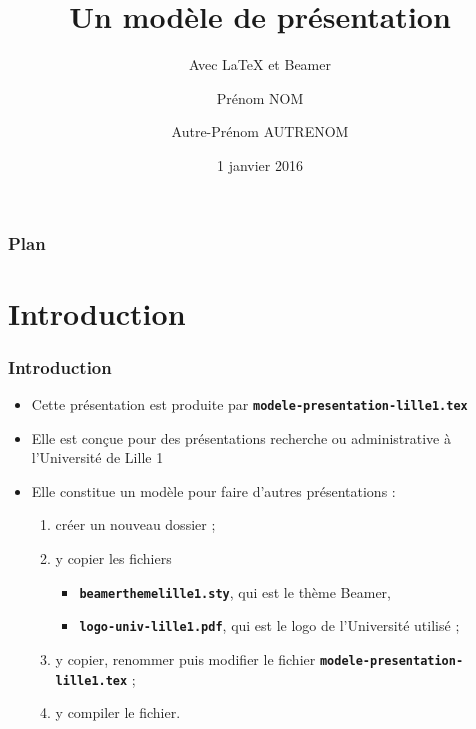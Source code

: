 \documentclass[10pt,t]{beamer}
\title{Un modèle de présentation}
\subtitle{Avec \LaTeX{} et Beamer}
\author{Prénom NOM \and Autre-Prénom AUTRENOM}
\institute{Université de Lille 1}
\date{1\ier{} janvier 2016}
\begin{document}
\maketitle

\begin{frame}
  \frametitle{Plan}
  \tableofcontents %
\end{frame}


\section{Introduction}


\begin{frame}%
  \frametitle{Introduction}


  \begin{itemize}
  \item Cette présentation est produite par \texttt{\textbf{modele-presentation-lille1.tex}}
  \item Elle est conçue pour des présentations recherche ou administrative à l'Université de Lille 1
  \end{itemize}

  \pause


  \begin{itemize}
  \item Elle constitue un modèle pour faire d'autres présentations :
    
    \begin{enumerate}
    \item créer un nouveau dossier ;
    \item y copier les fichiers 

      \begin{itemize}
      \item \texttt{\textbf{beamerthemelille1.sty}}, qui est le thème Beamer,
      \item \texttt{\textbf{logo-univ-lille1.pdf}}, qui est le logo de l'Université utilisé ;
      \end{itemize}

    \item y copier, renommer puis modifier le fichier \texttt{\textbf{modele-presentation-lille1.tex}} ;
    \item y compiler le fichier.
    \end{enumerate}
  \end{itemize}
  
\end{frame}
\end{document}
